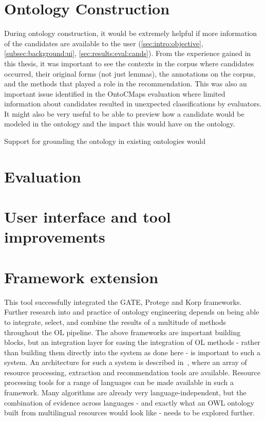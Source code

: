 \documentclass[a4paper]{report}
\begin{document}
\section{Ontology Construction}

During ontology construction, it would be extremely helpful if more information of the candidates are available to the user (\ref{sec:intro:objective}, \ref{subsec:background:ui}, \ref{sec:results:eval:cands}).
From the experience gained in this thesis, it was important to see the contexts in the corpus where candidates occurred, their original forms (not just lemmas), the annotations on the corpus, and the methods that played a role in the recommendation.
This was also an important issue identified in the OntoCMaps evaluation where limited information about candidates resulted in unexpected classifications by evaluators.
It might also be very useful to be able to preview how a candidate would be modeled in the ontology and the impact this would have on the ontology.

Support for grounding the ontology in existing ontologies would 


\section{Evaluation}
\section{User interface and tool improvements}
\section{Framework extension}

This tool successfully integrated the GATE, Protege and Korp frameworks.
Further research into and practice of ontology engineering depends on being able to integrate, select, and combine the results of a multitude of methods throughout the OL pipeline.
The above frameworks are important building blocks, but an integration layer for easing the integration of OL methods - rather than building them directly into the system as done here - is important to such a system.
An architecture for such a system is described in~\citep{Cimiano2009OL}, where an array of resource processing, extraction and recommendation tools are available.
Resource processing tools for a range of languages can be made available in such a framework.
Many algorithms are already very language-independent, but the combination of evidence across languages - and exactly what an OWL ontology built from multilingual resources would look like - needs to be explored further.
\end{document}
